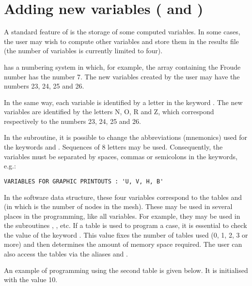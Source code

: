 \section{Adding new variables (
and )}

A standard feature of  is the storage of some computed variables.
In some cases, the user may wish to compute other variables and store them
in the results file (the number of variables is currently limited to four).

 has a numbering system in which, for example,
the array containing the Froude number has the number 7.
The new variables created by the user may have the numbers 23, 24, 25 and 26.

In the same way, each variable is identified by a letter in the keyword
.
The new variables are identified by the letters N, O, R and Z,
which correspond respectively to the numbers 23, 24, 25 and 26.

In the  subroutine, it is
possible to change the abbreviations (mnemonics) used for the keywords
 and
.
Sequences of 8 letters may be used.
Consequently, the variables must be separated by spaces, commas or
semicolons in the keywords, e.g.:

\begin{lstlisting}[language=TelemacCas]
VARIABLES FOR GRAPHIC PRINTOUTS : 'U, V, H, B'
\end{lstlisting}

In the software data structure, these four variables correspond to the tables
and  (in which  is the number of
nodes in the mesh).
These may be used in several places in the programming, like all \tel variables.
For example, they may be used in the subroutines ,
,  etc.
If a  table is used to program a case, it is essential
to check the value of the keyword .
This value fixes the number of tables used (0, 1, 2, 3 or more)
and then determines the amount of memory space required.
The user can also access the tables via the aliases
 and .

An example of programming using the second  table is given below.
It is initialised with the value 10.

